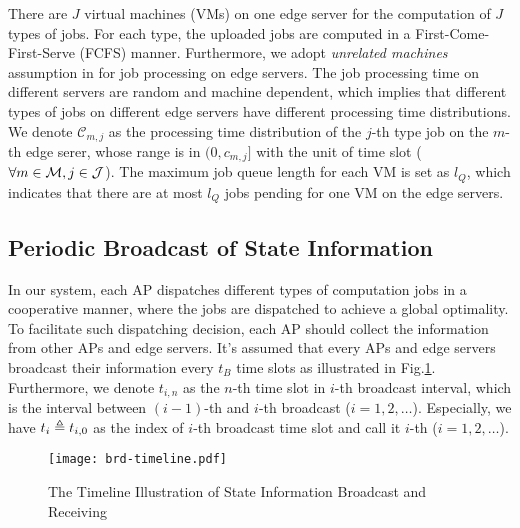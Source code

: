 There are $J$ virtual machines (VMs) on one edge server for the computation of $J$ types of jobs.
For each type, the uploaded jobs are computed in a First-Come-First-Serve (FCFS) manner.
Furthermore, we adopt \emph{unrelated machines} assumption in \cite{tan-online} for job processing on edge servers.
The job processing time on different servers are random and machine dependent, which implies that different types of jobs on different edge servers have different processing time distributions.
We denote $\mathcal{C}_{m,j}$ as the processing time distribution of the $j$-th type job on the $m$-th edge serer, whose range is in $(0, c_{m,j}]$ with the unit of time slot ($\forall m\in\mathcal{M}, j\in\mathcal{J}$).
The maximum job queue length for each VM is set as $l_Q$, which indicates that there are at most $l_Q$ jobs pending for one VM on the edge servers.


\subsection{Periodic Broadcast of State Information}
In our system, each AP dispatches different types of computation jobs in a cooperative manner, where the jobs are dispatched to achieve a global optimality.
To facilitate such dispatching decision, each AP should collect the information from other APs and edge servers.
It's assumed that every APs and edge servers broadcast their information every $t_B$ time slots as illustrated in Fig.\ref{fig:brd-timeline}.
Furthermore, we denote $t_{i,n}$ as the $n$-th time slot in $i$-th broadcast interval, which is the interval between $(i-1)$-th and $i$-th broadcast ($i=1,2,\dots$).
Especially, we have $t_{i} \triangleq t_{i,0}$ as the index of $i$-th broadcast time slot and call it $i$-th \brpoint ($i=1,2,\dots$).
\begin{figure}[ht]
    \centering
    \texttt{[image: brd-timeline.pdf]}
    \caption{The Timeline Illustration of State Information Broadcast and Receiving}
    \label{fig:brd-timeline}
\end{figure}

